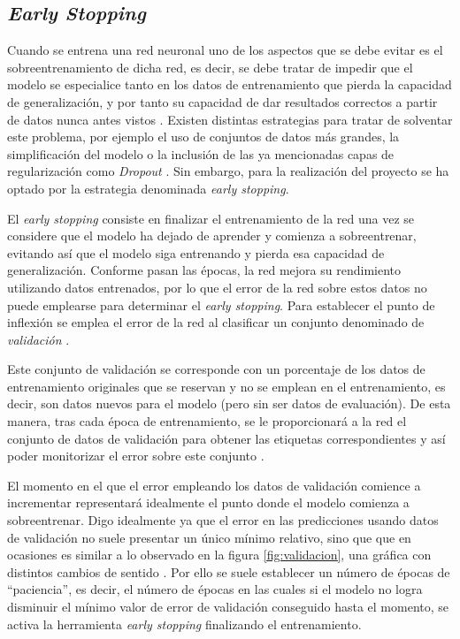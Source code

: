 \subsection{\textit{Early Stopping}}

Cuando se entrena una red neuronal uno de los aspectos que se debe evitar es el sobreentrenamiento de dicha red, es decir, se debe tratar de impedir que el modelo se especialice tanto en los datos de entrenamiento que pierda la capacidad de generalización, y por tanto su capacidad de dar resultados correctos a partir de datos nunca antes vistos \cite{early:butwhen}. Existen distintas estrategias para tratar de solventar este problema, por ejemplo el uso de conjuntos de datos más grandes, la simplificación del modelo o la inclusión de las ya mencionadas capas de regularización como \textit{Dropout} \cite{early:overview}. Sin embargo, para la realización del proyecto se ha optado por la estrategia denominada \textit{early stopping}.

El \textit{early stopping} consiste en finalizar el entrenamiento de la red una vez se considere que el modelo ha dejado de aprender y comienza a sobreentrenar, evitando así que el modelo siga entrenando y pierda esa capacidad de generalización. Conforme pasan las épocas, la red mejora su rendimiento utilizando datos entrenados, por lo que el error de la red sobre estos datos no puede emplearse para determinar el \textit{early stopping}. Para establecer el punto de inflexión se emplea el error de la red al clasificar un conjunto denominado de \textit{validación} \cite{early:butwhen}.

Este conjunto de validación se corresponde con un porcentaje de los datos de entrenamiento originales que se reservan y no se emplean en el entrenamiento, es decir, son datos nuevos para el modelo (pero sin ser datos de evaluación). De esta manera, tras cada época de entrenamiento, se le proporcionará a la red el conjunto de datos de validación para obtener las etiquetas correspondientes y así poder monitorizar el error sobre este conjunto \cite{early:overview}. 

El momento en el que el error empleando los datos de validación comience a incrementar representará idealmente el punto donde el modelo comienza a sobreentrenar. Digo idealmente ya que el error en las predicciones usando datos de validación no suele presentar un único mínimo relativo, sino que que en ocasiones es similar a lo observado en la figura \ref{fig:validacion}, una gráfica con distintos cambios de sentido \cite{early:butwhen}. Por ello se suele establecer un número de épocas de ``paciencia'', es decir, el número de épocas en las cuales si el modelo no logra disminuir el mínimo valor de error de validación conseguido hasta el momento, se activa la herramienta \textit{early stopping} finalizando el entrenamiento.

